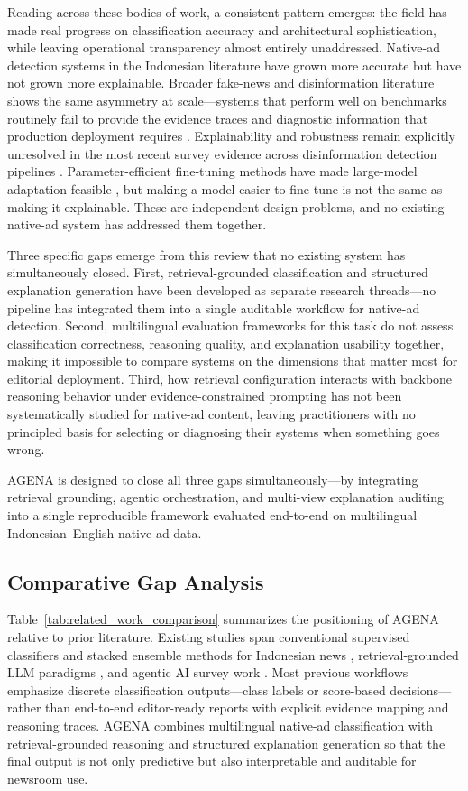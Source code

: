 \documentclass{ieeeaccess}
\begin{document}
Reading across these bodies of work, a consistent pattern emerges: the field has made real progress on classification accuracy and architectural sophistication, while leaving operational transparency almost entirely unaddressed. Native-ad detection systems in the Indonesian literature have grown more accurate but have not grown more explainable. Broader fake-news and disinformation literature shows the same asymmetry at scale—systems that perform well on benchmarks routinely fail to provide the evidence traces and diagnostic information that production deployment requires \cite{r9}. Explainability and robustness remain explicitly unresolved in the most recent survey evidence across disinformation detection pipelines \cite{r10}. Parameter-efficient fine-tuning methods have made large-model adaptation feasible \cite{r30}, but making a model easier to fine-tune is not the same as making it explainable. These are independent design problems, and no existing native-ad system has addressed them together.

Three specific gaps emerge from this review that no existing system has simultaneously closed. First, retrieval-grounded classification and structured explanation generation have been developed as separate research threads—no pipeline has integrated them into a single auditable workflow for native-ad detection. Second, multilingual evaluation frameworks for this task do not assess classification correctness, reasoning quality, and explanation usability together, making it impossible to compare systems on the dimensions that matter most for editorial deployment. Third, how retrieval configuration interacts with backbone reasoning behavior under evidence-constrained prompting has not been systematically studied for native-ad content, leaving practitioners with no principled basis for selecting or diagnosing their systems when something goes wrong.

AGENA is designed to close all three gaps simultaneously—by integrating retrieval grounding, agentic orchestration, and multi-view explanation auditing into a single reproducible framework evaluated end-to-end on multilingual Indonesian–English native-ad data.

\subsection{Comparative Gap Analysis}
Table~\ref{tab:related_work_comparison} summarizes the positioning of AGENA relative to prior literature. Existing studies span conventional supervised classifiers and stacked ensemble methods for Indonesian news \cite{r8,r6,r22}, retrieval-grounded LLM paradigms \cite{r20,r21}, and agentic AI survey work \cite{r13}. Most previous workflows emphasize discrete classification outputs—class labels or score-based decisions—rather than end-to-end editor-ready reports with explicit evidence mapping and reasoning traces. AGENA combines multilingual native-ad classification with retrieval-grounded reasoning and structured explanation generation so that the final output is not only predictive but also interpretable and auditable for newsroom use.
\end{document}
